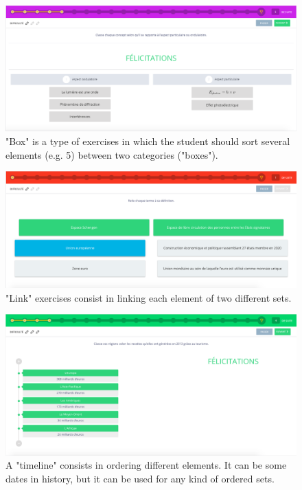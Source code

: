 \begin{figure}[!ht]
\centering
\includegraphics[clip, width= \textwidth]{1literature/fig/box.png}
\caption{"Box" is a type of exercises in which the student should sort several elements (e.g. 5) between two categories ("boxes").}
\label{fig:box}
\end{figure}

\begin{figure}[!ht]
\centering
\includegraphics[clip, width= \textwidth]{1literature/fig/link.png}
\caption{"Link" exercises consist in linking each element of two different sets.}
\label{fig:link}
\end{figure}

\begin{figure}[!ht]
\centering
\includegraphics[clip, width= \textwidth]{1literature/fig/timeline.png}
\caption{A "timeline" consists in ordering different elements. It can be some dates in history,  but it can be used for any kind of ordered sets.}
\label{fig:timeline}
\end{figure}

